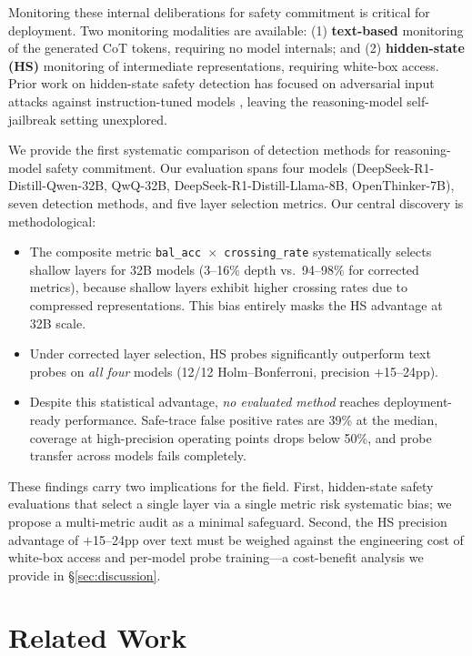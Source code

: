 \documentclass[11pt]{article}
\begin{document}
Monitoring these internal deliberations for safety commitment is critical for deployment. Two monitoring modalities are available: (1) \textbf{text-based} monitoring of the generated CoT tokens, requiring no model internals; and (2) \textbf{hidden-state (HS)} monitoring of intermediate representations, requiring white-box access. Prior work on hidden-state safety detection has focused on adversarial input attacks against instruction-tuned models \cite{wang2024mitigating,ji2024llmguard}, leaving the reasoning-model self-jailbreak setting unexplored.

We provide the first systematic comparison of detection methods for reasoning-model safety commitment. Our evaluation spans four models (DeepSeek-R1-Distill-Qwen-32B, QwQ-32B, DeepSeek-R1-Distill-Llama-8B, OpenThinker-7B), seven detection methods, and five layer selection metrics. Our central discovery is methodological:

\begin{itemize}
\item The composite metric \texttt{bal\_acc $\times$ crossing\_rate} systematically selects shallow layers for 32B models (3--16\% depth vs.\ 94--98\% for corrected metrics), because shallow layers exhibit higher crossing rates due to compressed representations. This bias entirely masks the HS advantage at 32B scale.
\item Under corrected layer selection, HS probes significantly outperform text probes on \emph{all four} models (12/12 Holm--Bonferroni, precision $+$15--24pp).
\item Despite this statistical advantage, \emph{no evaluated method} reaches deployment-ready performance. Safe-trace false positive rates are 39\% at the median, coverage at high-precision operating points drops below 50\%, and probe transfer across models fails completely.
\end{itemize}

These findings carry two implications for the field. First, hidden-state safety evaluations that select a single layer via a single metric risk systematic bias; we propose a multi-metric audit as a minimal safeguard. Second, the HS precision advantage of $+$15--24pp over text must be weighed against the engineering cost of white-box access and per-model probe training---a cost-benefit analysis we provide in \S\ref{sec:discussion}.


\section{Related Work}
\end{document}
